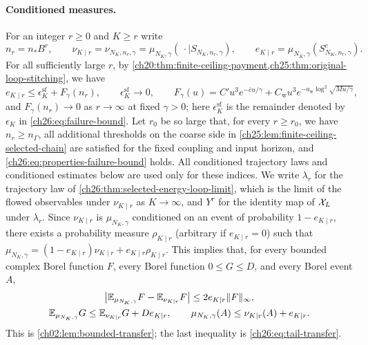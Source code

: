 \paragraph{Conditioned measures.}
For an integer $r\ge0$ and $K\ge r$ write
\[
 n_r=n_*B^r,\qquad
 \nu_{K\mid r}=\nu_{N_K,n_r,\gamma}=\mu_{N_K,\gamma}(\,\cdot\mid S_{N_K,n_r,\gamma}),\qquad
 e_{K\mid r}=\mu_{N_K,\gamma}(S_{N_K,n_r,\gamma}^c).
\]
For all sufficiently large $r$, by \cref{ch20:thm:finite-ceiling-payment,ch25:thm:original-loop-stitching}, we have
\begin{equation}\label{ch26:eq:properties-failure-bound}
 e_{K\mid r}\le\epsilon_K^{\mathrm{sf}}+F_\gamma(n_r),\qquad \epsilon_K^{\mathrm{sf}}\longrightarrow0,\qquad
 F_\gamma(u)=C'u^3e^{-\bar cu/\gamma}+C_{\mathrm w}u^3e^{-a_{\mathrm w}\log^2\sqrt{Mu/\gamma}},
\end{equation}
and $F_\gamma(n_r)\to0$ as $r\to\infty$ at fixed $\gamma>0$; here $\epsilon_K^{\mathrm{sf}}$ is the remainder denoted by $\epsilon_K$ in \eqref{ch26:eq:failure-bound}. Let $r_0$ be so large that, for every $r\ge r_0$, we have $n_r\ge n_\Gamma$, all additional thresholds on the coarse side in \cref{ch25:lem:finite-ceiling-selected-chain} are satisfied for the fixed coupling and input horizon, and \eqref{ch26:eq:properties-failure-bound} holds. All conditioned trajectory laws and conditioned estimates below are used only for these indices. We write $\lambda_r$ for the trajectory law of \cref{ch26:thm:selected-energy-loop-limit}, which is the limit of the flowed observables under $\nu_{K\mid r}$ as $K\to\infty$, and $Y^r$ for the identity map of $\mathcal X_L$ under $\lambda_r$. Since $\nu_{K\mid r}$ is $\mu_{N_K,\gamma}$ conditioned on an event of probability $1-e_{K\mid r}$, there exists a probability measure $\rho_{K\mid r}$ (arbitrary if $e_{K\mid r}=0$) such that $\mu_{N_K,\gamma}=(1-e_{K\mid r})\nu_{K\mid r}+e_{K\mid r}\rho_{K\mid r}$. This implies that, for every bounded complex Borel function $F$, every Borel function $0\le G\le D$, and every Borel event $A$,
\begin{equation}\label{ch26:eq:conditioning-inequality}
 \begin{gathered}
 \bigl\lvert\mathbb E_{\mu_{N_K,\gamma}}F-\mathbb E_{\nu_{K\mid r}}F\bigr\rvert\le2e_{K\mid r}\lVert F\rVert_\infty,\\
 \mathbb E_{\mu_{N_K,\gamma}}G\le\mathbb E_{\nu_{K\mid r}}G+De_{K\mid r},\qquad
 \mu_{N_K,\gamma}(A)\le\nu_{K\mid r}(A)+e_{K\mid r}.
 \end{gathered}
\end{equation}
This is \cref{ch02:lem:bounded-transfer}; the last inequality is \eqref{ch26:eq:tail-transfer}.

